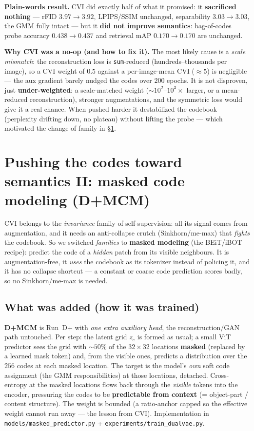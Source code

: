 \documentclass[11pt]{article}
\begin{document}
\textbf{Plain-words result.} CVI did exactly half of what it promised: it \textbf{sacrificed
nothing} --- rFID $3.97\!\to\!3.92$, LPIPS/SSIM unchanged, separability $3.03\!\to\!3.03$, the GMM
fully intact --- but it \textbf{did not improve semantics}: bag-of-codes probe accuracy
$0.438\!\to\!0.437$ and retrieval mAP $0.170\!\to\!0.170$ are unchanged.

\textbf{Why CVI was a no-op (and how to fix it).} The most likely cause is a \emph{scale
mismatch}: the reconstruction loss is \texttt{sum}-reduced (hundreds--thousands per image), so a
CVI weight of $0.5$ against a per-image-mean CVI ($\approx\!5$) is negligible --- the aux gradient
barely nudged the codes over $200$ epochs. It is not disproven, just \textbf{under-weighted}: a
scale-matched weight ($\sim$$10^2$--$10^3\times$ larger, or a mean-reduced reconstruction),
stronger augmentations, and the symmetric loss would give it a real chance. When pushed harder it
destabilized the codebook (perplexity drifting down, no plateau) without lifting the probe ---
which motivated the change of family in \S\ref{sec:mcm}.

\section{Pushing the codes toward semantics II: masked code modeling (D+MCM)}
\label{sec:mcm}
CVI belongs to the \emph{invariance} family of self-supervision: all its signal comes from
augmentation, and it needs an anti-collapse crutch (Sinkhorn/me-max) that \emph{fights} the codebook.
So we switched \emph{families} to \textbf{masked modeling} (the BEiT/iBOT recipe): predict the
code of a \emph{hidden} patch from its visible neighbours. It is augmentation-free, it \emph{uses} the
codebook as its tokenizer instead of policing it, and it has no collapse shortcut --- a constant or
coarse code prediction scores badly, so no Sinkhorn/me-max is needed.

\subsection*{What was added (how it was trained)}
\textbf{D+MCM} is Run~D+ with \emph{one extra auxiliary head}, the reconstruction/GAN path untouched.
Per step: the latent grid $z_{e}$ is formed as usual; a small ViT predictor sees the grid with
$\sim$$50\%$ of the $32\times32$ locations \textbf{masked} (replaced by a learned mask token) and, from
the visible ones, predicts a distribution over the $256$ codes at each masked location. The target is
the model's \emph{own} soft code assignment (the GMM responsibilities) at those locations, detached.
Cross-entropy at the masked locations flows back through the \emph{visible} tokens into the encoder,
pressuring the codes to be \textbf{predictable from context} (= object-part / content structure). The
weight is bounded (a ratio-anchor capped so the effective weight cannot run away --- the lesson from
CVI). Implementation in \texttt{models/masked\_predictor.py} + \texttt{experiments/train\_dualvae.py}.
\end{document}

